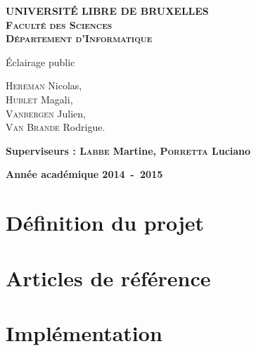 \documentclass[a4paper,10pt]{report}
\begin{document}
\begin{titlepage}
\begin{center}
\textbf{\textsc{UNIVERSIT\'E LIBRE DE BRUXELLES}}\\
\textbf{\textsc{Facult\'e des Sciences}}\\
\textbf{\textsc{D\'epartement d'Informatique}}
\vfill{}\vfill{}
\begin{center}{\Huge \'Eclairage public}\end{center}{\Huge \par}
\begin{center}{\large \textsc{Hereman} Nicolas,\\\textsc{Hublet} Magali,\\\textsc{Vanbergen} Julien,\\\textsc{Van Brande} Rodrigue.}\end{center}{\Huge \par}
\vfill{}\vfill{}
\begin{flushleft}{\large \textbf{Superviseurs : \textsc{Labbe} Martine, \textsc{Porretta} Luciano}}\hfill{}\end{flushleft}{\large\par}
\vfill{}\vfill{}\enlargethispage{3cm}
\textbf{Ann\'ee acad\'emique 2014~-~2015}
\end{center}
\end{titlepage}



\tableofcontents


\chapter{D\'efinition du projet}


\chapter{Articles de r\'ef\'erence}


\chapter{Impl\'ementation}




\end{document}
